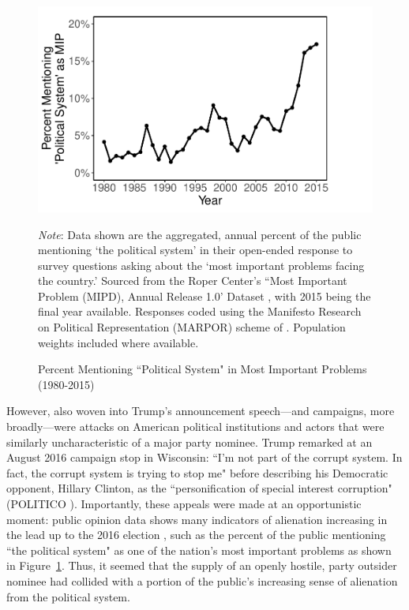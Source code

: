 \documentclass[12pt]{article}
\begin{document}
\begin{figure}[!t]
	\centering
	\includegraphics[width=0.7\linewidth]{Figures/MIP.pdf}
	\caption{Percent Mentioning ``Political System" in Most Important Problems (1980-2015)}\label{fig:mip}
	\vspace{-1em}
	{\scriptsize \textit{Note}: Data shown are the aggregated, annual percent of the public mentioning `the political system' in their open-ended response to survey questions asking about the `most important problems facing the country.' Sourced from the Roper Center's ``Most Important Problem (MIPD), Annual Release 1.0' Dataset \parencite[see also][]{heffington2019most}, with 2015 being the final year available. Responses coded using the Manifesto Research on Political Representation (MARPOR) scheme of \textcite{volkens2013mapping}. Population weights included where available.\par}
\end{figure}

However, also woven into Trump's announcement speech---and campaigns, more broadly---were attacks on American political institutions and actors that were similarly uncharacteristic of a major party nominee. Trump remarked at an August 2016 campaign stop in Wisconsin: ``I'm not part of the corrupt system. In fact, the corrupt system is trying to stop me" before describing his Democratic opponent, Hillary Clinton, as the ``personification of special interest corruption" (POLITICO \citeyear{politico2016trump}). Importantly, these appeals were made at an opportunistic moment: public opinion data shows many indicators of alienation increasing in the lead up to the 2016 election \parencite{citrin2018political}, such as the percent of the public mentioning ``the political system" as one of the nation's most important problems as shown in Figure~\ref{fig:mip}. Thus, it seemed that the supply of an openly hostile, party outsider nominee had collided with a portion of the public's increasing sense of alienation from the political system. 
\end{document}

